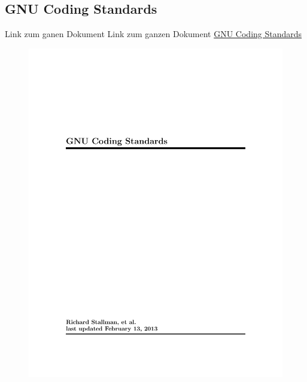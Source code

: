 \documentclass[a4paper,
               10pt,
               fleqn]{article}
\begin{document}
\begin{appendix}
    \section{GNU Coding Standards}
    Link zum ganen Dokument
    Link zum ganzen Dokument
    \href{http://www.gnu.org/prep/standards/}{GNU Coding Standards}
    \begin{figure}[h!]
    \includegraphics[page=5, width=1\textwidth]{gnustandard.pdf}
    \end{figure}
\end{appendix}
\end{document}
